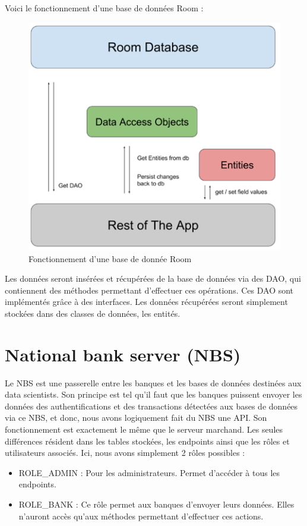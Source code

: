 Voici le fonctionnement d'une base de données Room :

\begin{figure}[H]
    \centering
    \includegraphics[width=\textwidth]{./img/joey-img-9.png}
    \caption{Fonctionnement d'une base de donnée Room}
    \label{fig:poc-room}
\end{figure}

Les données seront insérées et récupérées de la base de données via des DAO, qui contiennent des
méthodes permettant d'effectuer ces opérations. Ces DAO sont implémentés grâce à des interfaces.
Les données récupérées seront simplement stockées dans des classes de données, les entités.

\section{National bank server (NBS)}

Le NBS est une passerelle entre les banques et les bases de données destinées aux data scientists. Son
principe est tel qu'il faut que les banques puissent envoyer les données des authentifications et des
transactions détectées aux bases de données via ce NBS, et donc, nous avons logiquement fait du NBS
une API. Son fonctionnement est exactement le même que le serveur marchand. Les seules différences
résident dans les tables stockées, les endpoints ainsi que les rôles et utilisateurs associés.
Ici, nous avons simplement 2 rôles possibles :

\begin{itemize}
    \item ROLE\_ADMIN : Pour les administrateurs. Permet d'accéder à tous les endpoints.
    \item ROLE\_BANK : Ce rôle permet aux banques d'envoyer leurs données. Elles n'auront accès qu'aux méthodes permettant d'effectuer ces actions.
\end{itemize}

